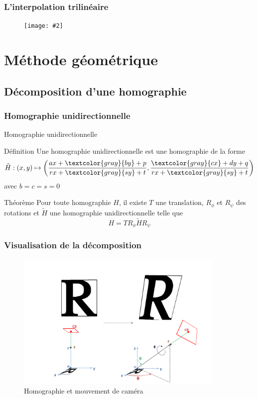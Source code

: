 \documentclass[c,12pt]{beamer}
\newcommand{\image}[2]{\begin{figure} \texttt{[image: \#2]}\end{figure}}
\newcommand{\gray}{\textcolor{gray}}
\newcommand{\fram}[2]{\begin{frame} \frametitle{#1} #2 \end{frame}}
\begin{document}
 
 \fram{L'interpolation trilinéaire}{\image{0.5}{intertri.jpg}}
 
     
     
     
    
     
     
     
     
     
     
     
     
     
     
\section{Méthode géométrique}
 
 \subsection{Décomposition d'une homographie}

  \subsubsection{Homographie unidirectionnelle}

  \begin{frame}{Homographie unidirectionnelle}
   \begin{block}{Définition}
    Une homographie unidirectionnelle est une homographie de la forme
    \[\tilde H : (x,y) \mapsto \left(\frac{ax+\gray{by}+p}{rx+\gray{sy}+t},\frac{\gray{cx}+dy+q}{rx+\gray{sy}+t}\right)\]
    avec $b=c=s=0$
   \end{block}
   \begin{block}{Théorème}
    Pour toute homographie $H$, il existe $T$ une translation, $R_\phi$ et $R_\psi$ des rotations et $\tilde H$ une homographie unidirectionnelle telle que
    \[H = T R_\phi \tilde H R_\psi\]
   \end{block}
  \end{frame}
  

  
\subsubsection{Visualisation de la décomposition}

  \begin{frame}
  \begin{figure}
   \centering
   \includegraphics[width=100mm]{beamer_decompo_all.png}
   \caption{Homographie et mouvement de caméra}
  \end{figure}
  \end{frame}
\end{document}
